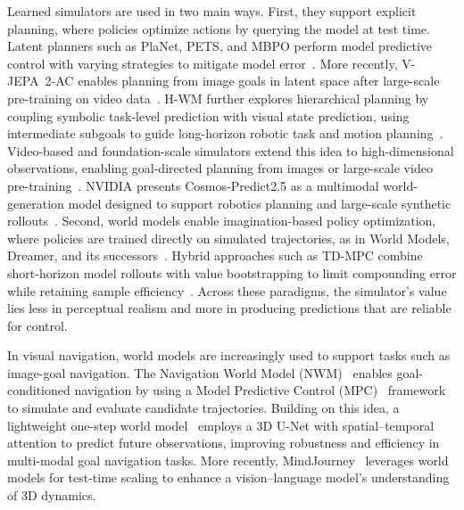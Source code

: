 \documentclass{article}
\begin{document}
Learned simulators are used in two main ways. First, they support explicit planning, where policies optimize actions by querying the model at test time. Latent planners such as PlaNet, PETS, and MBPO perform model predictive control with varying strategies to mitigate model error~\citep{hafner2019_planet,chua2018_pets,janner2019_mbpo}. More recently, V-JEPA~2-AC enables planning from image goals in latent space after large-scale pre-training on video data~\citep{assran2025vjepa2}. H-WM further explores hierarchical planning by coupling symbolic task-level prediction with visual state prediction, using intermediate subgoals to guide long-horizon robotic task and motion planning~\citep{chen2026h}.
Video-based and foundation-scale simulators extend this idea to high-dimensional observations, enabling goal-directed planning from images or large-scale video pre-training~\citep{finn2017_visualforesight,ebert2018_visualforesight}.  NVIDIA presents Cosmos-Predict2.5 as a multimodal world-generation model designed to support robotics planning and large-scale synthetic rollouts~\citep{nvidia2025_cosmos,ali2025_cosmospredict25}. 
Second, world models enable imagination-based policy optimization, where policies are trained directly on simulated trajectories, as in World Models, Dreamer, and its successors~\citep{ha2018_worldmodels,hafner2020_dreamer,hafner2023_dreamerv3}. Hybrid approaches such as TD-MPC combine short-horizon model rollouts with value bootstrapping to limit compounding error while retaining sample efficiency~\citep{hansen2022_tdmpc,hansen2024_tdmpc2}. Across these paradigms, the simulator’s value lies less in perceptual realism and more in producing predictions that are reliable for control.

In visual navigation, world models are increasingly used to support tasks such as image-goal navigation. The Navigation World Model (NWM)~\citep{bar2025navigation} enables goal-conditioned navigation by using a Model Predictive Control (MPC)~\citep{kouvaritakis2016model} framework to simulate and evaluate candidate trajectories. Building on this idea, a lightweight one-step world model~\citep{shen2026efficient} employs a 3D U-Net with spatial–temporal attention to predict future observations, improving robustness and efficiency in multi-modal goal navigation tasks. More recently, MindJourney~\citep{yang2025mindjourney} leverages world models for test-time scaling to enhance a vision–language model’s understanding of 3D dynamics.
\end{document}
